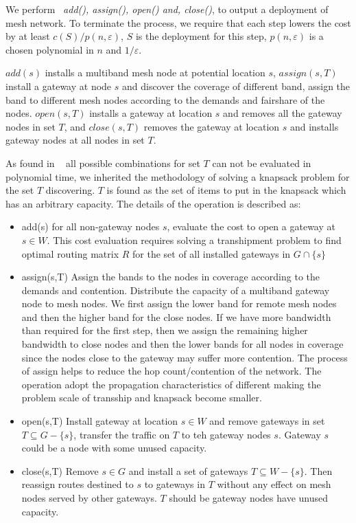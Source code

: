    We perform ~\emph{add(), assign(), open() and, close()}, to output a deployment of mesh network. 
   To terminate the process, we require that each step lowers the cost by at least $c(S)/p(n,\varepsilon)$, $S$ is the deployment for this step, $p(n,\varepsilon)$ is a chosen polynomial in $n$ and $1/ \varepsilon$.


   $add(s)$ installs a multiband mesh node at potential location $s$, $assign(s,T)$ install a gateway at node $s$ and discover the coverage of different band, assign the band to different mesh nodes according to the demands and fairshare of the nodes. $open(s,T)$ installs a gateway at location $s$ and removes all the gateway nodes in set $T$, and $close(s,T)$ removes the gateway at location $s$ and installs gateway nodes at all nodes in set $T$.

   As found in ~\cite{robinson2008adding} all possible combinations for set $T$ can not be evaluated in polynomial time, we inherited the methodology of solving a knapsack problem for the set $T$ discovering. $T$ is found as the set of items to put in the knapsack which has an arbitrary capacity.
   The details of the operation is described as:



   \begin{itemize}
   \item add(s) for all non-gateway nodes $s$, evaluate the cost to open a gateway at $s \in W$. This cost evaluation requires solving a transhipment problem to find optimal routing matrix $R$ for the set of all installed gateways in $G \cap \{s\}$
   \item assign(s,T) Assign the bands to the nodes in coverage according to the demands and contention. Distribute the capacity of a multiband gateway node to mesh nodes. 
    We first assign the lower band for remote mesh nodes and then the higher band for the close nodes. If we have more bandwidth than required for the first step, then we assign the remaining higher bandwidth to close nodes and then the lower bands for all nodes in coverage since the nodes close to the gateway may suffer more contention. The process of assign helps to reduce the hop count/contention of the network.
   The operation adopt the propagation characteristics of different making the problem scale of transship and knapsack become smaller.
   \item open(s,T) Install gateway at location $s \in W$ and remove gateways in set $T \subseteq G-\{s\}$, transfer the traffic on $T$ to teh gateway nodes $s$. Gateway $s$ could be a node with some unused capacity.
   \item close(s,T) Remove $s \in G$ and install a set of gateways $T \subseteq W-\{s\}$. Then reassign routes destined to $s$ to gateways in $T$ without any effect on mesh nodes served by other gateways. $T$ should be gateway nodes have unused capacity.
   \end{itemize}


